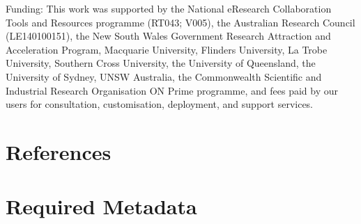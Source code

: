 \documentclass[preprint,12pt, a4paper]{elsarticle}
\begin{document}
Funding: This work was supported by the National eResearch Collaboration Tools and Resources programme (RT043; V005), the Australian Research Council (LE140100151), the New South Wales Government Research Attraction and Acceleration Program, Macquarie University, Flinders University, La Trobe University, Southern Cross University, the University of Queensland, the University of Sydney, UNSW Australia, the Commonwealth Scientific and Industrial Research Organisation ON Prime programme, and fees paid by our users for consultation, customisation, deployment, and support services.


\section*{References}


 







\section*{Required Metadata}



\end{document}
